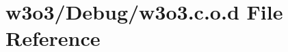 \hypertarget{w3o3_8c_8o_8d}{}\section{w3o3/\+Debug/w3o3.c.\+o.\+d File Reference}
\label{w3o3_8c_8o_8d}
